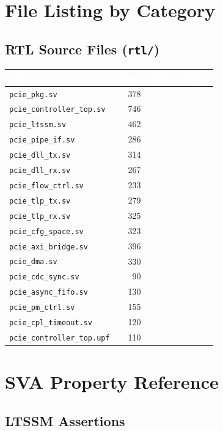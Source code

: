 \documentclass[12pt,a4paper]{report}
\newcommand{\theadcell}[1]{%
  \cellcolor{tablehead}\textcolor{white}{\textbf{#1}}}
\newcommand{\cmark}{\textcolor{scgreen}{\ding{51}}}
\begin{document}
\chapter{File Listing by Category}

\section{RTL Source Files (\texttt{rtl/})}

\begin{tabular}{lrl}
  \toprule
  \theadcell{File} & \theadcell{Lines} & \theadcell{New in v0.2.0} \\
  \midrule
  \texttt{pcie\_pkg.sv}             & 378 & \\
  \texttt{pcie\_controller\_top.sv} & 746 & \\
  \texttt{pcie\_ltssm.sv}           & 462 & \\
  \texttt{pcie\_pipe\_if.sv}        & 286 & \\
  \texttt{pcie\_dll\_tx.sv}         & 314 & \\
  \texttt{pcie\_dll\_rx.sv}         & 267 & \\
  \texttt{pcie\_flow\_ctrl.sv}      & 233 & \\
  \texttt{pcie\_tlp\_tx.sv}         & 279 & \\
  \texttt{pcie\_tlp\_rx.sv}         & 325 & \\
  \texttt{pcie\_cfg\_space.sv}      & 323 & \\
  \texttt{pcie\_axi\_bridge.sv}     & 396 & \\
  \texttt{pcie\_dma.sv}             & 330 & \\
  \texttt{pcie\_cdc\_sync.sv}       & 90  & \cmark \\
  \texttt{pcie\_async\_fifo.sv}     & 130 & \cmark \\
  \texttt{pcie\_pm\_ctrl.sv}        & 155 & \cmark \\
  \texttt{pcie\_cpl\_timeout.sv}    & 120 & \cmark \\
  \texttt{pcie\_controller\_top.upf}& 110 & \cmark \\
  \bottomrule
\end{tabular}

\chapter{SVA Property Reference}

\section{LTSSM Assertions}
\end{document}

